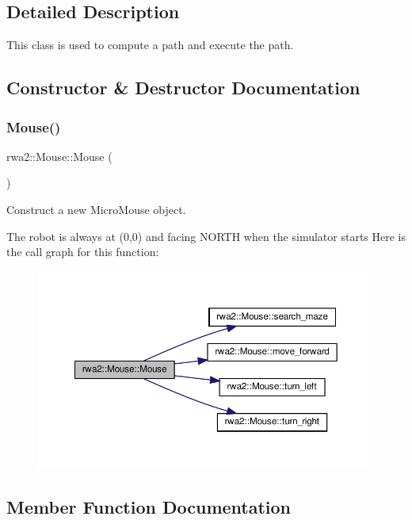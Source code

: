 \subsection{Detailed Description}
This class is used to compute a path and execute the path. 

\subsection{Constructor \& Destructor Documentation}
\mbox{\label{classrwa2_1_1_mouse_a048dffae3aaa3a6ddc2c6cc4741a097c}} 
\subsubsection{\texorpdfstring{Mouse()}{Mouse()}}
{\footnotesize\ttfamily rwa2\+::\+Mouse\+::\+Mouse (\begin{DoxyParamCaption}{ }\end{DoxyParamCaption})\hspace{0.3cm}{\ttfamily [inline]}}



Construct a new Micro\+Mouse object. 

The robot is always at (0,0) and facing N\+O\+R\+TH when the simulator starts Here is the call graph for this function\+:\nopagebreak
\begin{figure}[H]
\begin{center}
\leavevmode
\includegraphics[width=350pt]{classrwa2_1_1_mouse_a048dffae3aaa3a6ddc2c6cc4741a097c_cgraph}
\end{center}
\end{figure}


\subsection{Member Function Documentation}
\mbox{\label{classrwa2_1_1_mouse_a789be287a432bafc903c97396a014d7d}} 
